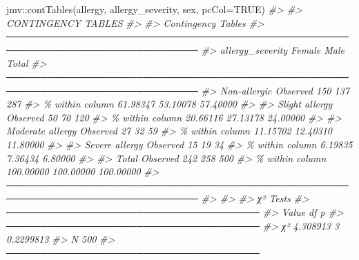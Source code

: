 \documentclass[
]{memoir}
\newenvironment{Shaded}{\begin{snugshade}}{\end{snugshade}}
\newcommand{\AttributeTok}[1]{\textcolor[rgb]{0.77,0.63,0.00}{#1}}
\newcommand{\CommentTok}[1]{\textcolor[rgb]{0.56,0.35,0.01}{\textit{#1}}}
\newcommand{\ConstantTok}[1]{\textcolor[rgb]{0.00,0.00,0.00}{#1}}
\newcommand{\FunctionTok}[1]{\textcolor[rgb]{0.00,0.00,0.00}{#1}}
\newcommand{\NormalTok}[1]{#1}
\newcommand{\SpecialCharTok}[1]{\textcolor[rgb]{0.00,0.00,0.00}{#1}}
\begin{document}
\begin{Shaded}
\begin{Highlighting}[]
\NormalTok{jmv}\SpecialCharTok{::}\FunctionTok{contTables}\NormalTok{(allergy, allergy\_severity, sex, }\AttributeTok{pcCol=}\ConstantTok{TRUE}\NormalTok{)}
\CommentTok{\#\textgreater{} }
\CommentTok{\#\textgreater{}  CONTINGENCY TABLES}
\CommentTok{\#\textgreater{} }
\CommentTok{\#\textgreater{}  Contingency Tables                                                             }
\CommentTok{\#\textgreater{}  ────────────────────────────────────────────────────────────────────────────── }
\CommentTok{\#\textgreater{}    allergy\_severity                       Female       Male         Total       }
\CommentTok{\#\textgreater{}  ────────────────────────────────────────────────────────────────────────────── }
\CommentTok{\#\textgreater{}    Non{-}allergic        Observed                 150          137          287   }
\CommentTok{\#\textgreater{}                        \% within column     61.98347     53.10078     57.40000   }
\CommentTok{\#\textgreater{}                                                                                 }
\CommentTok{\#\textgreater{}    Slight allergy      Observed                  50           70          120   }
\CommentTok{\#\textgreater{}                        \% within column     20.66116     27.13178     24.00000   }
\CommentTok{\#\textgreater{}                                                                                 }
\CommentTok{\#\textgreater{}    Moderate allergy    Observed                  27           32           59   }
\CommentTok{\#\textgreater{}                        \% within column     11.15702     12.40310     11.80000   }
\CommentTok{\#\textgreater{}                                                                                 }
\CommentTok{\#\textgreater{}    Severe allergy      Observed                  15           19           34   }
\CommentTok{\#\textgreater{}                        \% within column      6.19835      7.36434      6.80000   }
\CommentTok{\#\textgreater{}                                                                                 }
\CommentTok{\#\textgreater{}    Total               Observed                 242          258          500   }
\CommentTok{\#\textgreater{}                        \% within column    100.00000    100.00000    100.00000   }
\CommentTok{\#\textgreater{}  ────────────────────────────────────────────────────────────────────────────── }
\CommentTok{\#\textgreater{} }
\CommentTok{\#\textgreater{} }
\CommentTok{\#\textgreater{}  χ² Tests                              }
\CommentTok{\#\textgreater{}  ───────────────────────────────────── }
\CommentTok{\#\textgreater{}          Value       df    p           }
\CommentTok{\#\textgreater{}  ───────────────────────────────────── }
\CommentTok{\#\textgreater{}    χ²    4.308913     3    0.2299813   }
\CommentTok{\#\textgreater{}    N          500                      }
\CommentTok{\#\textgreater{}  ─────────────────────────────────────}
\end{Highlighting}
\end{Shaded}
\end{document}
